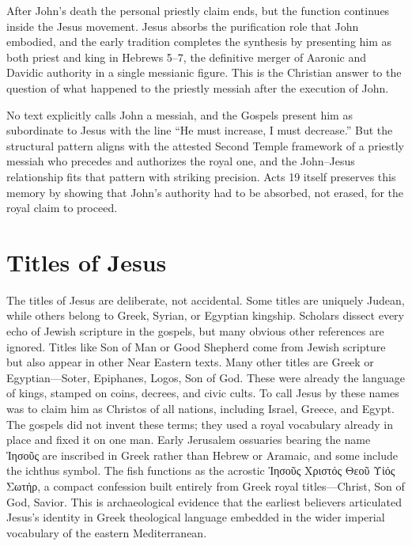 After John's death the personal priestly claim ends, but the function continues inside the Jesus movement.
Jesus absorbs the purification role that John embodied, and the early tradition completes the synthesis by presenting him as both priest and king in Hebrews 5--7, the definitive merger of Aaronic and Davidic authority in a single messianic figure.
This is the Christian answer to the question of what happened to the priestly messiah after the execution of John.

No text explicitly calls John a messiah, and the Gospels present him as subordinate to Jesus with the line ``He must increase, I must decrease.''
But the structural pattern aligns with the attested Second Temple framework of a priestly messiah who precedes and authorizes the royal one, and the John--Jesus relationship fits that pattern with striking precision.
Acts 19 itself preserves this memory by showing that John's authority had to be absorbed, not erased, for the royal claim to proceed.

\section{Titles of Jesus}\label{sec:titles-of-jesus}

The titles of Jesus are deliberate, not accidental.
Some titles are uniquely Judean, while others belong to Greek, Syrian, or Egyptian kingship.
Scholars dissect every echo of Jewish scripture in the gospels, but many obvious other references are ignored.
Titles like Son of Man or Good Shepherd come from Jewish scripture but also appear in other Near Eastern texts.
Many other titles are Greek or Egyptian---Soter, Epiphanes, Logos, Son of God.
These were already the language of kings, stamped on coins, decrees, and civic cults.
To call Jesus by these names was to claim him as Christos of all nations, including Israel, Greece, and Egypt.
The gospels did not invent these terms; they used a royal vocabulary already in place and fixed it on one man.
Early Jerusalem ossuaries bearing the name Ἰησοῦς are inscribed in Greek rather than Hebrew or Aramaic, and some include the ichthus symbol.
The fish functions as the acrostic Ἰησοῦς Χριστός Θεοῦ Υἱός Σωτήρ, a compact confession built entirely from Greek royal titles---Christ, Son of God, Savior.
This is archaeological evidence that the earliest believers articulated Jesus's identity in Greek theological language embedded in the wider imperial vocabulary of the eastern Mediterranean.

